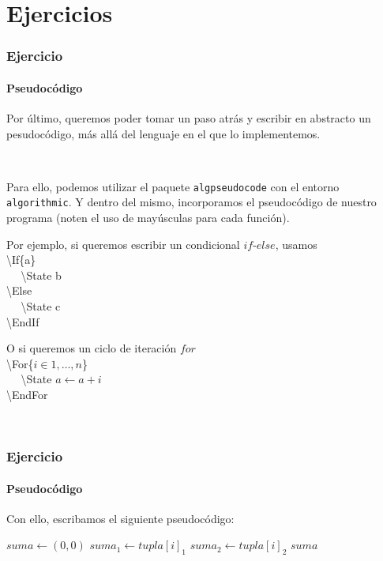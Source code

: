 \section{Ejercicios}\label{ejercicios}

\begin{frame}
\frametitle{Ejercicio}
\framesubtitle{Pseudocódigo}

Por último, queremos poder tomar un paso atrás y escribir en abstracto un pesudocódigo, más allá del lenguaje en el que lo implementemos.

\

Para ello, podemos utilizar el paquete \texttt{algpseudocode} con el entorno \texttt{algorithmic}. Y dentro del mismo, incorporamos el pseudocódigo de nuestro programa (noten el uso de mayúsculas para cada función).

\begin{multicols}{2}

Por ejemplo, si queremos escribir un condicional $if$-$else$, usamos \\

\textbackslash If\{a\} \\
$~~~~~~$\textbackslash State b \\
\textbackslash Else \\
$~~~~~~$\textbackslash State c \\
\textbackslash EndIf \\

\pause

O si queremos un ciclo de iteración $for$ \\

\textbackslash For\{$i \in 1,\ldots,n$\} \\
$~~~~~~$\textbackslash State $a \gets a + i$ \\
\textbackslash EndFor

\

\end{multicols}
\end{frame}

\begin{frame}
\frametitle{Ejercicio}
\framesubtitle{Pseudocódigo}

Con ello, escribamos el siguiente pseudocódigo:

\begin{tcolorbox}[colframe=color1]
\begin{center}
\begin{algorithmic}
        \State $suma \gets (0,0)$
            \State $suma_1 \gets tupla[i]_1$
            \State $suma_2 \gets tupla[i]_2$
        \EndFor
        \EndIf
        \State \Return $suma$
    \EndFunction
\end{algorithmic}
\end{center}
\end{tcolorbox}

\end{frame}